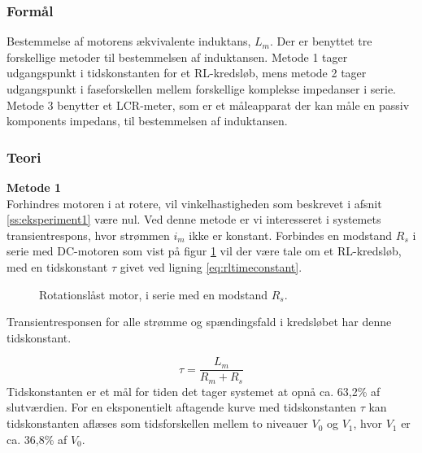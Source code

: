 \subsubsection{Formål}
Bestemmelse af motorens ækvivalente induktans, \(L_m\).
Der er benyttet tre forskellige metoder til bestemmelsen af induktansen.
Metode 1 tager udgangspunkt i tidskonstanten for et RL-kredsløb,
mens metode 2 tager udgangspunkt i faseforskellen mellem forskellige komplekse impedanser i serie.
Metode 3 benytter et LCR-meter, som er et måleapparat der kan måle en passiv komponents impedans, til bestemmelsen af induktansen.
\subsubsection{Teori}
\textbf{Metode 1}\\
Forhindres motoren i at rotere, vil vinkelhastigheden som beskrevet i afsnit \ref{ss:eksperiment1} være nul.
Ved denne metode er vi interesseret i systemets transientrespons, hvor strømmen \(i_m\) ikke er konstant.
Forbindes en modstand \(R_s\) i serie med DC-motoren som vist på figur \ref{fig:eksperiment2metode1} vil der være tale om et RL-kredsløb, med en tidskonstant \(\tau\) givet ved ligning \ref{eq:rltimeconstant}.

\begin{figure}[!th]
\centering
\begin{circuitikz}
  
\end{circuitikz}
\caption[Rotationslåst motor med \(R_s\)]{Rotationslåst motor, i serie med en modstand \(R_s\).}
\label{fig:eksperiment2metode1}
\end{figure}


Transientresponsen for alle strømme og spændingsfald i kredsløbet har denne tidskonstant.

\begin{equation}
	\tau=\frac{L_m}{R_m+R_s}
	\label{eq:rltimeconstant} 
 \end{equation}
Tidskonstanten er et mål for tiden det tager systemet at opnå ca. 63,2\% af slutværdien. For en eksponentielt aftagende kurve med tidskonstanten \(\tau\) kan tidskonstanten aflæses som
tidsforskellen mellem to niveauer \(V_0\) og \(V_1\), hvor \(V_1\) er ca. 36,8\% af \(V_0\).

